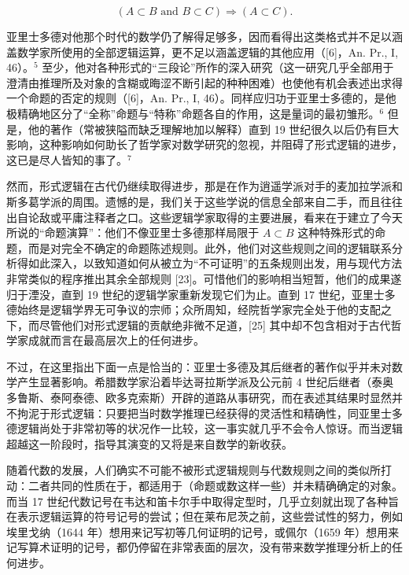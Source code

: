 \[
(A \subset B \text {   and   } B \subset C) \Rightarrow (A \subset C).
\]

亚里士多德对他那个时代的数学仍了解得足够多，因而看得出这类格式并不足以涵盖数学家所使用的全部逻辑运算，更不足以涵盖逻辑的其他应用（{[}6{]}，An. Pr., I, 46）。\(^{5}\) 至少，他对各种形式的“三段论”所作的深入研究（这一研究几乎全部用于澄清由推理所及对象的含糊或晦涩不断引起的种种困难）也使他有机会表述出求得一个命题的否定的规则（{[}6{]}，An. Pr., I, 46）。同样应归功于亚里士多德的，是他极精确地区分了“全称”命题与“特称”命题各自的作用，这是量词的最初雏形。\(^{6}\) 但是，他的著作（常被狭隘而缺乏理解地加以解释）直到 19 世纪很久以后仍有巨大影响，这种影响如何助长了哲学家对数学研究的忽视，并阻碍了形式逻辑的进步，这已是尽人皆知的事了。\(^{7}\)

然而，形式逻辑在古代仍继续取得进步，那是在作为逍遥学派对手的麦加拉学派和斯多葛学派的周围。遗憾的是，我们关于这些学说的信息全部来自二手，而且往往出自论敌或平庸注释者之口。这些逻辑学家取得的主要进展，看来在于建立了今天所说的“命题演算”：他们不像亚里士多德那样局限于 \(A \subset B\) 这种特殊形式的命题，而是对完全不确定的命题陈述规则。此外，他们对这些规则之间的逻辑联系分析得如此深入，以致知道如何从被立为“不可证明”的五条规则出发，用与现代方法非常类似的程序推出其余全部规则 {[}23{]}。可惜他们的影响相当短暂，他们的成果遂归于湮没，直到 19 世纪的逻辑学家重新发现它们为止。直到 17 世纪，亚里士多德始终是逻辑学界无可争议的宗师；众所周知，经院哲学家完全处于他的支配之下，而尽管他们对形式逻辑的贡献绝非微不足道，{[}25{]} 其中却不包含相对于古代哲学家成就而言在最高层次上的任何进步。

不过，在这里指出下面一点是恰当的：亚里士多德及其后继者的著作似乎并未对数学产生显著影响。希腊数学家沿着毕达哥拉斯学派及公元前 4 世纪后继者（泰奥多鲁斯、泰阿泰德、欧多克索斯）开辟的道路从事研究，而在表述其结果时显然并不拘泥于形式逻辑：只要把当时数学推理已经获得的灵活性和精确性，同亚里士多德逻辑尚处于非常初等的状况作一比较，这一事实就几乎不会令人惊讶。而当逻辑超越这一阶段时，指导其演变的又将是来自数学的新收获。

随着代数的发展，人们确实不可能不被形式逻辑规则与代数规则之间的类似所打动：二者共同的性质在于，都适用于（命题或数这样一些）并未精确确定的对象。而当 17 世纪代数记号在韦达和笛卡尔手中取得定型时，几乎立刻就出现了各种旨在表示逻辑运算的符号记号的尝试；但在莱布尼茨之前，这些尝试性的努力，例如埃里戈纳（1644 年）想用来记写初等几何证明的记号，或佩尔（1659 年）想用来记写算术证明的记号，都仍停留在非常表面的层次，没有带来数学推理分析上的任何进步。

